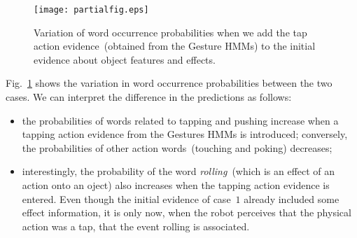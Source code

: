 \begin{figure}
\centering
\texttt{[image: partialfig.eps]}
\caption{Variation of word occurrence probabilities when we add the tap action evidence~(obtained from the Gesture \acp{HMM}) to the initial evidence about object features and effects.}
\label{fig:probdiff}
\end{figure}

Fig.~\ref{fig:probdiff} shows the variation in word occurrence probabilities between the two cases. We can interpret the difference in the predictions as follows:
\begin{itemize}
\item the probabilities of words related to tapping and pushing increase when a tapping action evidence from the Gestures \acp{HMM} is introduced; conversely, the probabilities of other action words~(touching and poking) decreases;

\item interestingly, the probability of the word \emph{rolling}~(which is an effect of an action onto an oject) also increases when the tapping action evidence is entered. Even though the initial evidence of case~$1$ already included some effect information, it is only now, when the robot perceives that the physical action was a tap, that the event rolling is associated.
\end{itemize}


